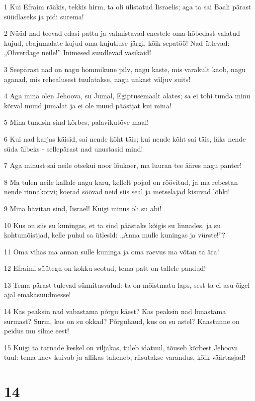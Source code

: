 \par 1 Kui Efraim rääkis, tekkis hirm, ta oli ülistatud Iisraelis; aga ta sai Baali pärast süüdlaseks ja pidi surema!
\par 2 Nüüd nad teevad edasi pattu ja valmistavad enestele oma hõbedast valatud kujud, ebajumalate kujud oma kujutluse järgi, kõik sepatöö! Nad ütlevad: „Ohverdage neile!” Inimesed suudlevad vasikaid!
\par 3 Seepärast nad on nagu hommikune pilv, nagu kaste, mis varakult kaob, nagu aganad, mis rehealusest tuulatakse, nagu unkast väljuv suits!
\par 4 Aga mina olen Jehoova, su Jumal, Egiptusemaalt alates; sa ei tohi tunda minu kõrval muud jumalat ja ei ole muud päästjat kui mina!
\par 5 Mina tundsin sind kõrbes, palavikutõve maal!
\par 6 Kui nad karjas käisid, sai nende kõht täis; kui nende kõht sai täis, läks nende süda ülbeks - sellepärast nad unustasid mind!
\par 7 Aga minust sai neile otsekui noor lõukoer, ma luuran tee ääres nagu panter!
\par 8 Ma tulen neile kallale nagu karu, kellelt pojad on röövitud, ja ma rebestan nende rinnakorvi; koerad söövad neid siis seal ja metselajad kisuvad lõhki!
\par 9 Mina hävitan sind, Iisrael! Kuigi minus oli su abi!
\par 10 Kus on siis su kuningas, et ta sind päästaks kõigis su linnades, ja su kohtumõistjad, kelle puhul sa ütlesid: „Anna mulle kuningas ja vürste!”?
\par 11 Oma vihas ma annan sulle kuninga ja oma raevus ma võtan ta ära!
\par 12 Efraimi süütegu on kokku seotud, tema patt on tallele pandud!
\par 13 Tema pärast tulevad sünnitusvalud: ta on mõistmatu laps, sest ta ei asu õigel ajal emakasuudmesse!
\par 14 Kas peaksin nad vabastama põrgu käest? Kas peaksin nad lunastama surmast? Surm, kus on su okkad? Põrguhaud, kus on su astel? Kaastunne on peidus mu silme eest!
\par 15 Kuigi ta tarnade keskel on viljakas, tuleb idatuul, tõuseb kõrbest Jehoova tuul: tema kaev kuivab ja allikas taheneb; riisutakse varandus, kõik väärtasjad!

\chapter{14}

